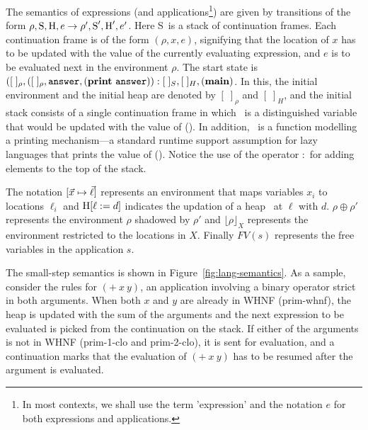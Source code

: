 \documentclass[9pt]{sigplanconf}
\def\myvec{\mathaccent"017E }
\newcommand{\stk}{\mbox{S}}
\begin{document}
The  semantics  of   expressions  (and  applications\footnote{In  most
  contexts, we  shall use  the term 'expression' and the notation $e$  for
both  expressions and
  applications.}) are  given by transitions  of the form  $\rho, \stk,
\heap, e \rightarrow \rho', \stk', \heap', e'$.  Here \stk\ is a stack
of  continuation  frames.  Each  continuation  frame  is  of the  form
$(\rho, x, e)$, signifying that the  location of $x$ has to be updated
with the  value of the currently  evaluating expression, and $e$  is to be
evaluated  next  in  the  environment  $\rho$.   The  start  state  is
$([\;]_\rho,([\;]_\rho,  \mathbf{\mbox{\tt answer}},   (\mathbf{print}~\mathbf{\mbox{\tt answer}})):[\;]_{S}  ,  [\;]_{H},
(\mathbf{main})$.  In  this, the initial  environment and the  initial heap
are  denoted  by  $[\;]_\rho$  and  $[\;]_H$, and  the  initial  stack
consists  of  a  single  continuation   frame  in  which  \ans\  is  a
distinguished  variable  that  would  be  updated with  the  value  of
(\mainpgm).  In  addition, \print\ is a function  modelling a printing
mechanism---a standard  runtime support assumption  for lazy languages
that prints the  value of (\mainpgm).  Notice the  use of the operator
$:$ for adding elements to the top of the stack.




The notation  $[\myvec{x}   \mapsto  \myvec{\ell}]$   represents  an
environment that maps variables $x_i$
to locations $\ell_i$
and  $\mbox{H}[\ell :=  d]$
indicates the  updation of  a heap \heap\  at $\ell$ with  $d$.  $\rho
\oplus \rho'$  represents the  environment $\rho$ shadowed  by $\rho'$
and $\lfloor \rho \rfloor_X$  represents the environment restricted to
the locations in $X$. Finally $FV(s)$ represents the free variables in
the application $s$.

The small-step semantics  is shown in Figure~\ref{fig:lang-semantics}.
As  a sample,  consider  the  rules  for  $(+~x~y)$, an  application
involving a binary operator strict in both arguments.   When
both $x$  and $y$ are already  in WHNF ({\sc prim-whnf}),  the heap is
updated with the  sum of the arguments and  the next expression to be
evaluated is picked from the continuation on the stack. If either of the
arguments is not in
WHNF  ({\sc  prim-1-clo}  and   {\sc  prim-2-clo}),  it  is  sent  for
evaluation, and a continuation  marks that the evaluation of $(+~x~y)$
has to be resumed after the argument is evaluated.
\end{document}

